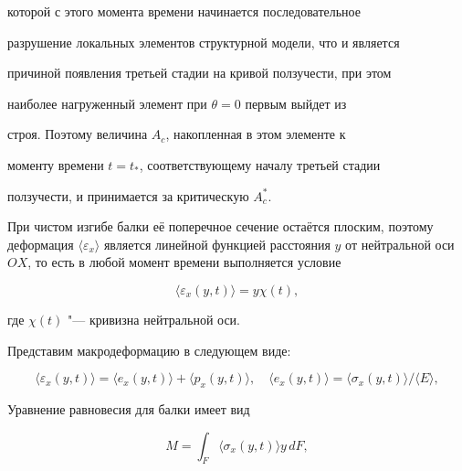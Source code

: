 которой с этого момента времени начинается последовательное

разрушение локальных элементов структурной модели, что и является

причиной появления третьей стадии на кривой ползучести, при этом

наиболее нагруженный элемент при $\theta=0$ первым выйдет из

строя. Поэтому величина $A_c$, накопленная в этом элементе к

моменту времени $t=t_*$, соответствующему  началу третьей стадии

ползучести, и принимается за критическую $A_c^*$.



\smallskip



 При чистом изгибе балки её поперечное сечение остаётся плоским, поэтому деформация $\langle \varepsilon_x \rangle$ является линейной функцией расстояния $y$ от нейтральной оси $OX$, то есть в любой момент времени выполняется условие

\begin{equation}

\label{nebogina:eq:9} \langle\varepsilon_x(y,t)\rangle= y \chi(t),

\end{equation}

где $\chi(t)$ "--- кривизна нейтральной оси.



Представим макродеформацию в следующем виде:

\begin{equation}

\label{nebogina:eq:10} \langle\varepsilon_x(y,t)\rangle= \langle

e_x(y,t)\rangle+\langle p_x (y,t)\rangle, \quad \langle e_x

(y,t)\rangle= {\langle \sigma_x (y,t)\rangle}/{\langle E\rangle},

\end{equation}

Уравнение равновесия для балки имеет вид

\begin{equation}

\label{nebogina:eq:11}

 M= \int _F \langle \sigma_x (y,t) \rangle y \, dF,

\end{equation}

